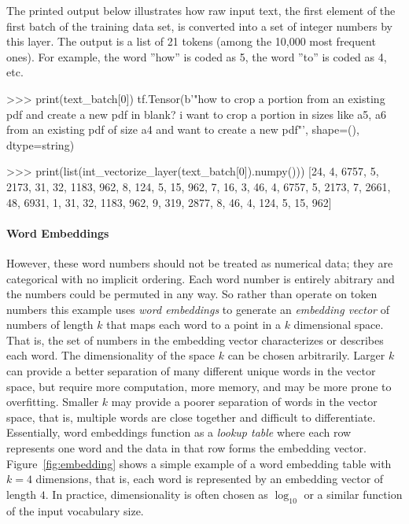 The printed output below illustrates how raw input text, the first element of the first batch of the training data set, is converted into a set of integer numbers by this layer. The output is a list of 21 tokens (among the 10,000 most frequent ones). For example, the word ''how'' is coded as 5, the word ''to'' is coded as 4, etc.

\begin{textcode}
>>> print(text_batch[0])
tf.Tensor(b'"how to crop a portion from an existing pdf and create 
a new pdf in blank? i want to crop a portion in sizes like a5, a6 
from an existing pdf of size a4 and want to create a new pdf"\n', 
shape=(), dtype=string)

>>> print(list(int_vectorize_layer(text_batch[0]).numpy()))
[24, 4, 6757, 5, 2173, 31, 32, 1183, 962, 8, 124, 5, 15, 962, 7, 16, 
3, 46, 4, 6757, 5, 2173, 7, 2661, 48, 6931, 1, 31, 32, 1183, 962, 9, 
319, 2877, 8, 46, 4, 124, 5, 15, 962]
\end{textcode}

\paragraph*{Word Embeddings}

However, these word numbers should not be treated as numerical data; they are categorical with no implicit ordering. Each word number is entirely abitrary and the numbers could be permuted in any way. So rather than operate on token numbers this example uses \emph{word embeddings} to generate an \emph{embedding vector} of numbers of length $k$ that maps each word to a point in a $k$ dimensional space. That is, the set of numbers in the embedding vector characterizes or describes each word. The dimensionality of the space $k$ can be chosen arbitrarily. Larger $k$ can provide a better separation of many different unique words in the vector space, but require more computation, more memory, and may be more prone to overfitting. Smaller $k$ may provide a poorer separation of words in the vector space, that is, multiple words are close together and difficult to differentiate. Essentially, word embeddings function as a \emph{lookup table} where each row represents one word and the data in that row forms the embedding vector. Figure~\ref{fig:embedding} shows a simple example of a word embedding table with $k=4$ dimensions, that is, each word is represented by an embedding vector of length $4$. In practice, dimensionality is often chosen as $\operatorname{log}_{10}$ or a similar function of the input vocabulary size. 

